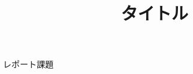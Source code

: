 \documentclass[uplatex, 11pt,a4j, titlepage]{jsarticle}
\begin{document}
\title{タイトル}{レポート課題}



\end{document}
